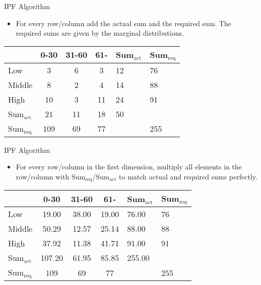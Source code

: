 \documentclass{beamer}
\begin{document}
\begin{frame}{IPF Algorithm}
\begin{itemize}
  \item For every row/column add the actual sum and the required sum. The required sums are given by the marginal distributions. 
\end{itemize}

\begin{table}
\centering
\begin{tabular}{l||c c c||l|l}
 & 0-30 & 31-60 & 61- & Sum$_{\mathrm{act}}$ & Sum$_{\mathrm{req}}$\\
\hline \hline
Low & 3 & 6 & 3 & 12 & 76 \\
Middle & 8 & 2 & 4 & 14 & 88 \\
High & 10 & 3 & 11 & 24 & 91 \\
\hline \hline
Sum$_{\mathrm{act}}$ & 21 & 11 & 18 & 50 & \\
\hline
Sum$_{\mathrm{req}}$ & 109 & 69 & 77 & & 255 \\
\end{tabular}
\end{table}
\end{frame}


\begin{frame}{IPF Algorithm}
\begin{itemize}
  \item For every row/column in the first dimension, multiply all elements in the row/column with Sum$_{\mathrm{req}}$/Sum$_{\mathrm{act}}$ to match
actual and required sums perfectly.
\end{itemize}

\begin{table}
\centering
\begin{tabular}{l||c c c||l|l}
 & 0-30 & 31-60 & 61- & Sum$_{\mathrm{act}}$ & Sum$_{\mathrm{req}}$\\
\hline \hline
Low & 19.00 & 38.00 & 19.00 & 76.00 & 76 \\
Middle & 50.29 & 12.57 & 25.14 & 88.00 & 88 \\
High & 37.92 & 11.38 & 41.71 & 91.00 & 91 \\
\hline \hline
Sum$_{\mathrm{act}}$ & 107.20 & 61.95 & 85.85 & 255.00 & \\
\hline
Sum$_{\mathrm{req}}$ & 109 & 69 & 77 & & 255 \\
\end{tabular}
\end{table}
\end{frame}
\end{document}
